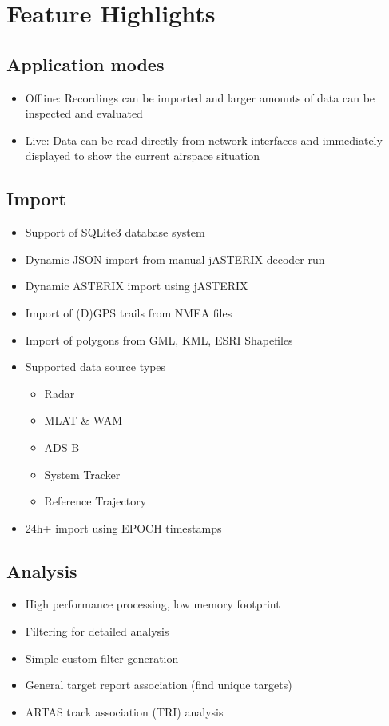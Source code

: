 \section{Feature Highlights}

\subsection{Application modes}
\begin{itemize} 
    \item Offline: Recordings can be imported and larger amounts of data can be inspected and evaluated
    \item Live: Data can be read directly from network interfaces and immediately displayed to show the current airspace situation
\end{itemize}

\subsection{Import}
\begin{itemize}  
    \item Support of SQLite3 database system
    \item Dynamic JSON import from manual jASTERIX decoder run %
    \item Dynamic ASTERIX import using jASTERIX
    \item Import of (D)GPS trails from NMEA files
    \item Import of polygons from GML, KML, ESRI Shapefiles
    \item Supported data source types
    \begin{itemize}  
        \item Radar
        \item MLAT \& WAM
        \item ADS-B
        \item System Tracker
        \item Reference Trajectory
    \end{itemize}
    \item 24h+ import using EPOCH timestamps    
\end{itemize}

\subsection{Analysis}
\begin{itemize}  
    \item High performance processing, low memory footprint
    \item Filtering for detailed analysis
    \item Simple custom filter generation
    \item General target report association (find unique targets)
    \item ARTAS track association (TRI) analysis
\end{itemize}


